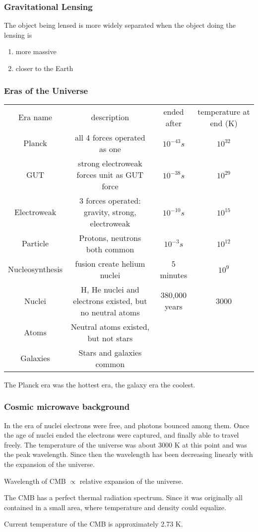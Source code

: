 \subsubsection{Gravitational Lensing}

The object being lensed is more widely separated when the object doing the lensing is
\begin{enumerate}
\item more massive
\item closer to the Earth
\end{enumerate}

\subsubsection{Eras of the Universe}

\begin{tabular}{c|c|c|c}
Era name        & description                                              & ended after   & temperature at end (K) \\
Planck          & all 4 forces operated as one                             & $10^{-43} s$  & $10^{32}$ \\
GUT             & strong electroweak forces unit as GUT force              & $10^{-38} s$  & $10^{29}$ \\
Electroweak     & 3 forces operated: gravity, strong, electroweak          & $10^{-10} s$  & $10^{15}$ \\
Particle        & Protons, neutrons both common                            & $10^{-3} s$   & $10^{12}$ \\
Nucleosynthesis & fusion create helium nuclei                              & 5 minutes     & $10^{9}$ \\
Nuclei          & H, He nuclei and electrons existed, but no neutral atoms & 380,000 years & 3000 \\
Atoms           & Neutral atoms existed, but not stars                     &               & \\
Galaxies        & Stars and galaxies common                                &               &
\end{tabular}

The Planck era was the hottest era, the galaxy era the coolest.

\subsubsection{Cosmic microwave background}
In the era of nuclei electrons were free, and photons bounced among them.  Once the age of nuclei ended the electrons were captured, and finally able to travel freely.  The temperature of the universe was about 3000 K at this point and was the peak wavelength.  Since then the wavelength has been decreasing linearly with the expansion of the universe.

Wavelength of CMB $\propto$ relative expansion of the universe.

The CMB has a perfect thermal radiation spectrum.  Since it was originally all contained in a small area, where temperature and density could equalize.

Current temperature of the CMB is approximately 2.73 K.
